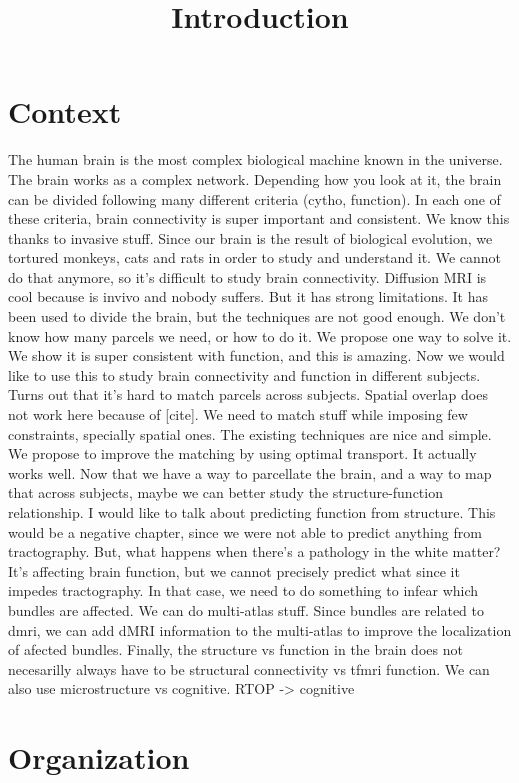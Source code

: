 \title{Introduction}

\section{Context}

The human brain is the most complex biological machine known in the universe.
The brain works as a complex network.
Depending how you look at it, the brain can be divided following many different criteria (cytho, function).
In each one of these criteria, brain connectivity is super important and consistent.
We know this thanks to invasive stuff.
Since our brain is the result of biological evolution, we tortured monkeys, cats and rats in order to study and understand it.
We cannot do that anymore, so it's difficult to study brain connectivity.
Diffusion MRI is cool because is invivo and nobody suffers.
But it has strong limitations.
It has been used to divide the brain, but the techniques are not good enough.
We don't know how many parcels we need, or how to do it.
We propose one way to solve it.
We show it is super consistent with function, and this is amazing.
Now we would like to use this to study brain connectivity and function in different subjects.
Turns out that it's hard to match parcels across subjects.
Spatial overlap does not work here because of [cite].
We need to match stuff while imposing few constraints, specially spatial ones.
The existing techniques are nice and simple.
We propose to improve the matching by using optimal transport.
It actually works well.
Now that we have a way to parcellate the brain, and a way to map that across subjects, maybe we can better study the structure-function relationship.
I would like to talk about predicting function from structure.
This would be a negative chapter, since we were not able to predict anything from tractography.
But, what happens when there's a pathology in the white matter?
It's affecting brain function, but we cannot precisely predict what since it impedes tractography.
In that case, we need to do something to infear which bundles are affected.
We can do multi-atlas stuff.
Since bundles are related to dmri, we can add dMRI information to the multi-atlas to improve the localization of afected bundles.
Finally, the structure vs function in the brain does not necesarilly always have to be structural connectivity vs tfmri function.
We can also use microstructure vs cognitive.
RTOP -> cognitive

\section{Organization}

